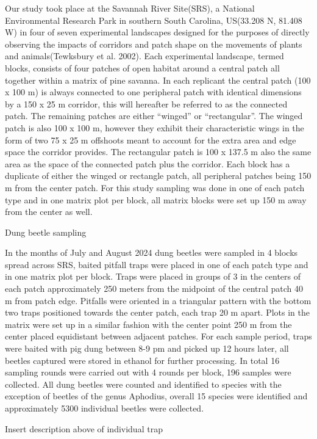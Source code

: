\documentclass[
]{article}
\begin{document}
Our study took place at the Savannah River Site(SRS), a National
Environmental Research Park in southern South Carolina, US(33.208 N,
81.408 W) in four of seven experimental landscapes designed for the
purposes of directly observing the impacts of corridors and patch shape
on the movements of plants and animals(Tewksbury et al. 2002). Each
experimental landscape, termed blocks, consists of four patches of open
habitat around a central patch all together within a matrix of pine
savanna. In each replicant the central patch (100 x 100 m) is always
connected to one peripheral patch with identical dimensions by a 150 x
25 m corridor, this will hereafter be referred to as the connected
patch. The remaining patches are either ``winged'' or ``rectangular''.
The winged patch is also 100 x 100 m, however they exhibit their
characteristic wings in the form of two 75 x 25 m offshoots meant to
account for the extra area and edge space the corridor provides. The
rectangular patch is 100 x 137.5 m also the same area as the space of
the connected patch plus the corridor. Each block has a duplicate of
either the winged or rectangle patch, all peripheral patches being 150 m
from the center patch. For this study sampling was done in one of each
patch type and in one matrix plot per block, all matrix blocks were set
up 150 m away from the center as well.

Dung beetle sampling

In the months of July and August 2024 dung beetles were sampled in 4
blocks spread across SRS, baited pitfall traps were placed in one of
each patch type and in one matrix plot per block. Traps were placed in
groups of 3 in the centers of each patch approximately 250 meters from
the midpoint of the central patch 40 m from patch edge. Pitfalls were
oriented in a triangular pattern with the bottom two traps positioned
towards the center patch, each trap 20 m apart. Plots in the matrix were
set up in a similar fashion with the center point 250 m from the center
placed equidistant between adjacent patches. For each sample period,
traps were baited with pig dung between 8-9 pm and picked up 12 hours
later, all beetles captured were stored in ethanol for further
processing. In total 16 sampling rounds were carried out with 4 rounds
per block, 196 samples were collected. All dung beetles were counted and
identified to species with the exception of beetles of the genus
Aphodius, overall 15 species were identified and approximately 5300
individual beetles were collected.

Insert description above of individual trap
\end{document}
